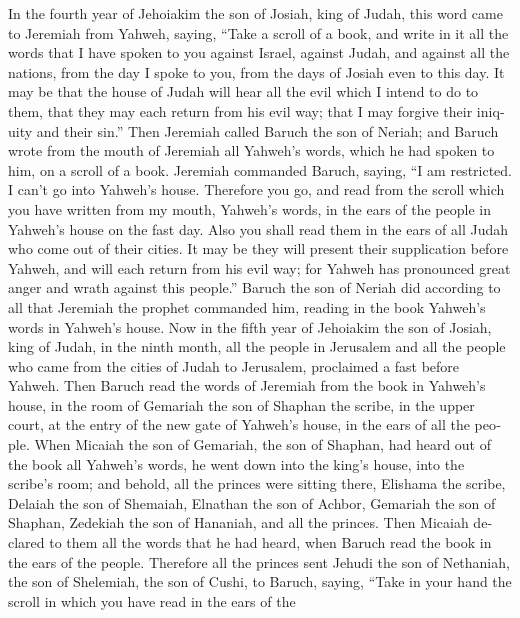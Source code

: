 \begin{paracol}{2}
\begin{otherlanguage}{english}
 In the fourth year of Jehoiakim the son of Josiah, king
of Judah, this word came to Jeremiah from Yahweh, saying, 
``Take a scroll of a book, and write in it all the words that I have
spoken to you against Israel, against Judah, and against all the
nations, from the day I spoke to you, from the days of Josiah even to
this day.  It may be that the house of Judah will hear all
the evil which I intend to do to them, that they may each return from
his evil way; that I may forgive their iniquity and their sin.''
 Then Jeremiah called Baruch the son of Neriah; and Baruch
wrote from the mouth of Jeremiah all Yahweh's words, which he had spoken
to him, on a scroll of a book.  Jeremiah commanded Baruch,
saying, ``I am restricted. I can't go into Yahweh's house.
 Therefore you go, and read from the scroll which you have
written from my mouth, Yahweh's words, in the ears of the people in
Yahweh's house on the fast day. Also you shall read them in the ears of
all Judah who come out of their cities.  It may be they
will present their supplication before Yahweh, and will each return from
his evil way; for Yahweh has pronounced great anger and wrath against
this people.''  Baruch the son of Neriah did according to
all that Jeremiah the prophet commanded him, reading in the book
Yahweh's words in Yahweh's house.  Now in the fifth year
of Jehoiakim the son of Josiah, king of Judah, in the ninth month, all
the people in Jerusalem and all the people who came from the cities of
Judah to Jerusalem, proclaimed a fast before Yahweh. 
Then Baruch read the words of Jeremiah from the book in Yahweh's house,
in the room of Gemariah the son of Shaphan the scribe, in the upper
court, at the entry of the new gate of Yahweh's house, in the ears of
all the people.  When Micaiah the son of Gemariah, the
son of Shaphan, had heard out of the book all Yahweh's words,
 he went down into the king's house, into the scribe's
room; and behold, all the princes were sitting there, Elishama the
scribe, Delaiah the son of Shemaiah, Elnathan the son of Achbor,
Gemariah the son of Shaphan, Zedekiah the son of Hananiah, and all the
princes.  Then Micaiah declared to them all the words
that he had heard, when Baruch read the book in the ears of the people.
 Therefore all the princes sent Jehudi the son of
Nethaniah, the son of Shelemiah, the son of Cushi, to Baruch, saying,
``Take in your hand the scroll in which you have read in the ears of the

\end{otherlanguage}
\end{paracol}
